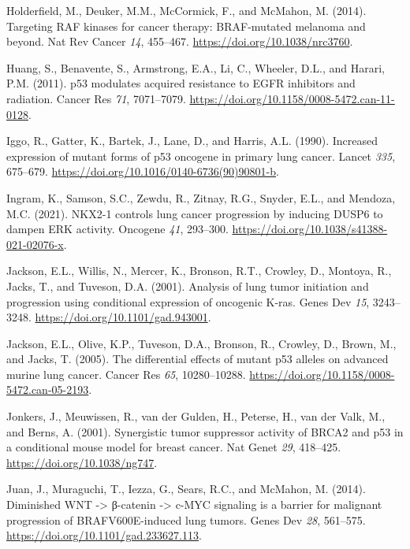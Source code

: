 \begin{CSLReferences}{0}{0}
\leavevmode{}%
Holderfield, M., Deuker, M.M., McCormick, F., and McMahon, M. (2014). Targeting RAF kinases for cancer therapy: BRAF-mutated melanoma and beyond. Nat Rev Cancer \emph{14}, 455--467. \url{https://doi.org/10.1038/nrc3760}.

\leavevmode{}%
Huang, S., Benavente, S., Armstrong, E.A., Li, C., Wheeler, D.L., and Harari, P.M. (2011). p53 modulates acquired resistance to EGFR inhibitors and radiation. Cancer Res \emph{71}, 7071--7079. \url{https://doi.org/10.1158/0008-5472.can-11-0128}.

\leavevmode{}%
Iggo, R., Gatter, K., Bartek, J., Lane, D., and Harris, A.L. (1990). Increased expression of mutant forms of p53 oncogene in primary lung cancer. Lancet \emph{335}, 675--679. \url{https://doi.org/10.1016/0140-6736(90)90801-b}.

\leavevmode{}%
Ingram, K., Samson, S.C., Zewdu, R., Zitnay, R.G., Snyder, E.L., and Mendoza, M.C. (2021). NKX2-1 controls lung cancer progression by inducing DUSP6 to dampen ERK activity. Oncogene \emph{41}, 293--300. \url{https://doi.org/10.1038/s41388-021-02076-x}.

\leavevmode{}%
Jackson, E.L., Willis, N., Mercer, K., Bronson, R.T., Crowley, D., Montoya, R., Jacks, T., and Tuveson, D.A. (2001). Analysis of lung tumor initiation and progression using conditional expression of oncogenic K-ras. Genes Dev \emph{15}, 3243--3248. \url{https://doi.org/10.1101/gad.943001}.

\leavevmode{}%
Jackson, E.L., Olive, K.P., Tuveson, D.A., Bronson, R., Crowley, D., Brown, M., and Jacks, T. (2005). The differential effects of mutant p53 alleles on advanced murine lung cancer. Cancer Res \emph{65}, 10280--10288. \url{https://doi.org/10.1158/0008-5472.can-05-2193}.

\leavevmode{}%
Jonkers, J., Meuwissen, R., van der Gulden, H., Peterse, H., van der Valk, M., and Berns, A. (2001). Synergistic tumor suppressor activity of BRCA2 and p53 in a conditional mouse model for breast cancer. Nat Genet \emph{29}, 418--425. \url{https://doi.org/10.1038/ng747}.

\leavevmode{}%
Juan, J., Muraguchi, T., Iezza, G., Sears, R.C., and McMahon, M. (2014). Diminished WNT -\textgreater{} β-catenin -\textgreater{} c-MYC signaling is a barrier for malignant progression of BRAFV600E-induced lung tumors. Genes Dev \emph{28}, 561--575. \url{https://doi.org/10.1101/gad.233627.113}.


\end{CSLReferences}

